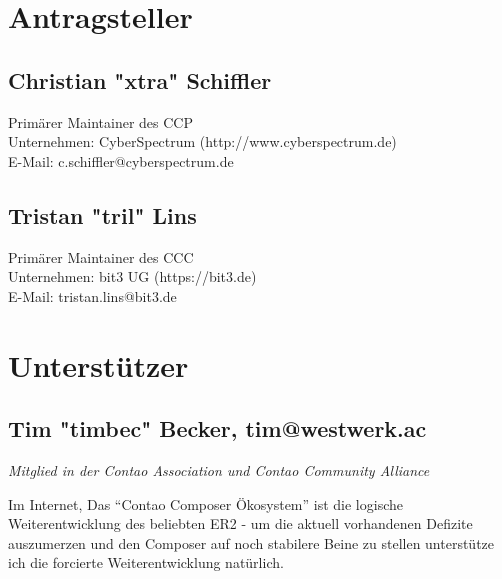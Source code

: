 \documentclass[
paper=a4,
draft=false,%
fontsize=10pt%
]{scrartcl}
\begin{document}
%
%

\newpage

\section{Antragsteller}

\subsection{Christian "xtra" Schiffler}

Primärer Maintainer des CCP \\
Unternehmen: CyberSpectrum (http://www.cyberspectrum.de) \\
E-Mail: c.schiffler@cyberspectrum.de

\subsection{Tristan "tril" Lins}

Primärer Maintainer des CCC \\
Unternehmen: bit3 UG (https://bit3.de) \\
E-Mail: tristan.lins@bit3.de

%
%

\newpage

\section{Unterstützer}

\subsection{Tim "timbec" Becker, tim@westwerk.ac}

\emph{Mitglied in der Contao Association und Contao Community Alliance}

Im Internet, Das “Contao Composer Ökosystem” ist die logische Weiterentwicklung des beliebten ER2 - um die aktuell vorhandenen Defizite auszumerzen und den Composer auf noch stabilere Beine zu stellen unterstütze ich die forcierte Weiterentwicklung natürlich.
\end{document}
